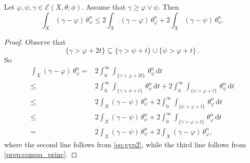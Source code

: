 \begin{lemma}\label{lma:intdom1}
	Let $\varphi,\psi,\gamma\in \mathcal{E}(X,\theta;\phi)$. Assume that $\gamma\geq \varphi\lor\psi$.
	Then
	\[
	\int_X (\gamma-\varphi)\,\theta_{\psi}^n\leq 2\int_X (\gamma-\varphi)\,\theta_{\varphi}^n+2\int_X (\gamma-\psi)\,\theta_{\psi}^n.
	\]
\end{lemma}
\begin{proof}
	Observe that
	\begin{equation}\label{eq:gvp2}
		\{\gamma>\varphi+2t\}\subseteq \{\gamma>\psi+t \}\cup \{\psi>\varphi+t\}\,.
	\end{equation}
	So
	\[
	\begin{aligned}
		\int_X (\gamma-\varphi)\,\theta_{\psi}^n
		=& 2\int_0^{\infty} \int_{\{\gamma>\varphi+2t\}}\,\theta_{\psi}^n\,\mathrm{d}t \\
		\leq& 2\int_0^{\infty} \int_{\{\gamma>\psi+t\}}\,\theta_{\psi}^n\,\mathrm{d}t+
		2\int_0^{\infty} \int_{\{\psi>\varphi+t\}}\,\theta_{\psi}^n\,\mathrm{d}t\\
		\leq & 2\int_X (\gamma-\psi) \,\theta_{\psi}^n+2\int_0^{\infty} \int_{\{\psi>\varphi+t\}}\,\theta_{\varphi}^n\,\mathrm{d}t\\
		\leq & 2\int_X (\gamma-\psi) \,\theta_{\psi}^n+2\int_0^{\infty} \int_{\{\gamma>\varphi+t\}}\,\theta_{\varphi}^n\,\mathrm{d}t\\
		=&2\int_X (\gamma-\psi) \,\theta_{\psi}^n+2\int_X (\gamma-\varphi) \,\theta_{\varphi}^n,
	\end{aligned}
	\]
    where the second line follows from \eqref{eq:gvp2}, while the third line follows from \cref{prop:compa_princ}.
\end{proof}

